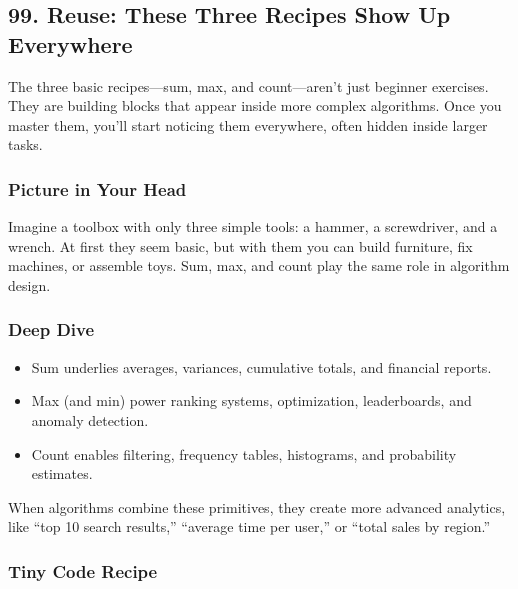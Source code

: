 \documentclass[
  letterpaper,
  DIV=11,
  numbers=noendperiod]{scrreprt}
\providecommand{\tightlist}{%
  \setlength{\itemsep}{0pt}\setlength{\parskip}{0pt}}
\begin{document}
\subsection{99. Reuse: These Three Recipes Show Up
Everywhere}\label{reuse-these-three-recipes-show-up-everywhere}

The three basic recipes---sum, max, and count---aren't just beginner
exercises. They are building blocks that appear inside more complex
algorithms. Once you master them, you'll start noticing them everywhere,
often hidden inside larger tasks.

\subsubsection{Picture in Your Head}\label{picture-in-your-head-99}

Imagine a toolbox with only three simple tools: a hammer, a screwdriver,
and a wrench. At first they seem basic, but with them you can build
furniture, fix machines, or assemble toys. Sum, max, and count play the
same role in algorithm design.

\subsubsection{Deep Dive}\label{deep-dive-69}

\begin{itemize}
\tightlist
\item
  Sum underlies averages, variances, cumulative totals, and financial
  reports.
\item
  Max (and min) power ranking systems, optimization, leaderboards, and
  anomaly detection.
\item
  Count enables filtering, frequency tables, histograms, and probability
  estimates.
\end{itemize}

When algorithms combine these primitives, they create more advanced
analytics, like ``top 10 search results,'' ``average time per user,'' or
``total sales by region.''

\subsubsection{Tiny Code Recipe}\label{tiny-code-recipe-97}
\end{document}
